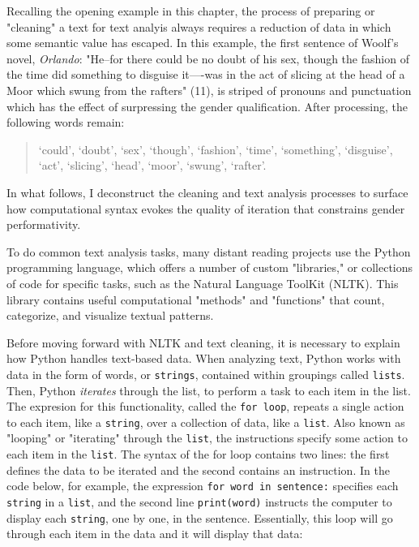 \documentclass[11pt]{article}
\begin{document}
Recalling the opening example in this chapter, the process of
preparing or "cleaning" a text for text analyis always requires a
reduction of data in which some semantic value has escaped. In this
example, the first sentence of Woolf's novel, \emph{Orlando}: "He–for there
could be no doubt of his sex, though the fashion of the time did
something to disguise it—-was in the act of slicing at the head of a
Moor which swung from the rafters" (11), is striped of pronouns and
punctuation which has the effect of surpressing the gender
qualification. After processing, the following words remain:

\begin{quote}
‘could’, ‘doubt’, ‘sex’, ‘though’, ‘fashion’, ‘time’, ‘something’,
‘disguise’, ‘act’, ‘slicing’, ‘head’, ‘moor’, ‘swung’, ‘rafter’. 
\end{quote}

In what follows, I deconstruct the cleaning and text analysis
processes to surface how computational syntax evokes the quality of
iteration that constrains gender performativity. 

To do common text analysis tasks, many distant reading projects use
the Python programming language, which offers a number of custom
"libraries," or collections of code for specific tasks, such as the
Natural Language ToolKit (NLTK). This library contains useful
computational "methods" and "functions" that count, categorize, and
visualize textual patterns.

Before moving forward with NLTK and text cleaning, it is necessary to
explain how Python handles text-based data. When analyzing text,
Python works with data in the form of words, or \texttt{strings}, contained
within groupings called \texttt{lists}. Then, Python \emph{iterates} through the
list, to perform a task to each item in the list. The expresion for
this functionality, called the \texttt{for loop}, repeats a single action to
each item, like a \texttt{string}, over a collection of data, like a
\texttt{list}. Also known as "looping" or "iterating" through the \texttt{list}, the
instructions specify some action to each item in the \texttt{list}. The
syntax of the for loop contains two lines: the first defines the data
to be iterated and the second contains an instruction. In the code
below, for example, the expression \texttt{for word in sentence:} specifies
each \texttt{string} in a \texttt{list}, and the second line \texttt{print(word)} instructs
the computer to display each \texttt{string}, one by one, in the
sentence. Essentially, this loop will go through each item in the data
and it will display that data:
\end{document}
